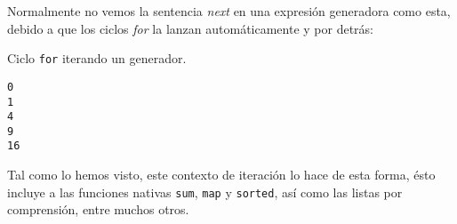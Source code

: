 Normalmente no vemos la sentencia \emph{next} en una expresión
generadora como esta, debido a que los ciclos \emph{for} la lanzan
automáticamente y por detrás:\\

\begin{code} Ciclo \texttt{for} iterando un generador.

\begin{Shaded}
\begin{Highlighting}[]
\OperatorTok{**}  \NormalTok{(}\NormalTok{)):}
\end{Highlighting}
\end{Shaded}

\begin{verbatim}
0
1
4
9
16

\end{verbatim}
\end{code}

Tal como lo hemos visto, este contexto de iteración lo hace de esta
forma, ésto incluye a las funciones nativas \texttt{sum}, \texttt{map} y
\texttt{sorted}, así como las listas por comprensión, entre muchos
otros.\\

